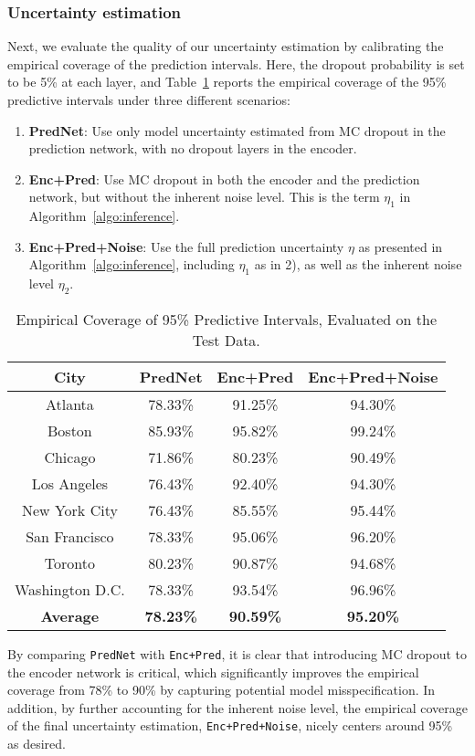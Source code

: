 \documentclass[conference,compsoc,final]{IEEEtran}
\begin{document}
\subsubsection{Uncertainty estimation}
Next, we evaluate the quality of our uncertainty estimation by calibrating the empirical coverage of the prediction intervals. Here, the dropout probability is set to be 5\% at each layer, and Table~\ref{tab:coverage} reports the empirical coverage of the 95\% predictive intervals under three different scenarios: 

	\begin{enumerate}
	\item {\bf PredNet}: Use only model uncertainty estimated from MC dropout in the prediction network, with no dropout layers in the encoder.
	\item {\bf Enc+Pred}: Use MC dropout in both the encoder and the prediction network, but without the inherent noise level. This is the term $\eta_1$ in Algorithm~\ref{algo:inference}. 
    \item {\bf Enc+Pred+Noise}: Use the full prediction uncertainty $\eta$ as presented in Algorithm~\ref{algo:inference},  including $\eta_1$ as in 2), as well as the inherent noise level $\eta_2$.
	\end{enumerate}
    
\begin{table}[!t]
\renewcommand{\arraystretch}{1.3}
\caption{Empirical Coverage of 95\% Predictive Intervals, Evaluated on the Test Data.
}
\label{tab:coverage}
\centering
\begin{tabular}{| c | c | c | c |}
\hline
{\bf City} & {\bf PredNet}  & {\bf Enc+Pred} & {\bf Enc+Pred+Noise}\\
\hline
Atlanta & 78.33\% & 91.25\% & 94.30\% \\
\hline
Boston & 85.93\% & 95.82\% & 99.24\% \\
\hline
Chicago & 71.86\% & 80.23\% & 90.49\% \\
\hline
Los Angeles & 76.43\% & 92.40\%  & 94.30\% \\
\hline
New York City & 76.43\% & 85.55\%  & 95.44\% \\
\hline
San Francisco & 78.33\% & 95.06\% & 96.20\% \\
\hline
Toronto & 80.23\% & 90.87\% & 94.68\% \\
\hline
Washington D.C. & 78.33\% & 93.54\% & 96.96\% \\
\hline
{\bf Average} & {\bf 78.23\%} & {\bf 90.59\%} &  {\bf 95.20\%} \\
\hline
\end{tabular}
\end{table}
By comparing {\tt PredNet} with {\tt Enc+Pred}, it is clear that introducing MC dropout to the encoder network is critical, which significantly improves the empirical coverage from 78\% to 90\% by capturing potential model misspecification. In addition, by further accounting for the inherent noise level, the empirical coverage of the final uncertainty estimation, {\tt Enc+Pred+Noise}, nicely centers around 95\% as desired.  
\end{document}
